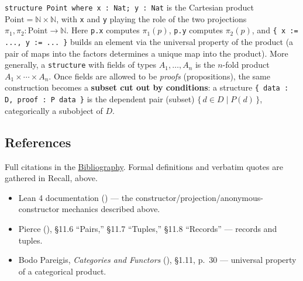 \begin{mathreading}

\texttt{structure Point where x : Nat; y : Nat} is the Cartesian product \(\mathrm{Point} = \mathbb{N} \times \mathbb{N}\), with \texttt{x} and \texttt{y} playing the role of the two projections \(\pi_1, \pi_2 : \mathrm{Point} \to \mathbb{N}\). Here \texttt{p.x} computes \(\pi_1(p)\), \texttt{p.y} computes \(\pi_2(p)\), and \texttt{\{ x := ..., y := ... \}} builds an element via the universal property of the product (a pair of maps into the factors determines a unique map into the product). More generally, a \texttt{structure} with fields of types \(A_1, \ldots, A_n\) is the \(n\)-fold product \(A_1 \times \cdots \times A_n\). Once fields are allowed to be \emph{proofs} (propositions), the same construction becomes a \textbf{subset cut out by conditions}: a structure \texttt{\{ data : D, proof : P data \}} is the dependent pair (subset) \(\{\, d \in D \mid P(d) \,\}\), categorically a subobject of \(D\).

\end{mathreading}

\subsection{References}\label{sec:02-functions-and-structures:01-structure-basics:3}

Full citations in the \hyperref[sec:root:bibliography:1]{Bibliography}. Formal definitions and verbatim quotes are gathered in Recall, above.

\begin{itemize}
\tightlist
\item
  Lean 4 documentation (\cite{LeanDocs}) --- the constructor/projection/anonymous-constructor mechanics described above.
\item
  Pierce (\cite{Pierce2002}), §11.6 ``Pairs,'' §11.7 ``Tuples,'' §11.8 ``Records'' --- records and tuples.
\item
  Bodo Pareigis, \emph{Categories and Functors} (\cite{Pareigis1970}), §1.11, p.~30 --- universal property of a categorical product.
\end{itemize}
